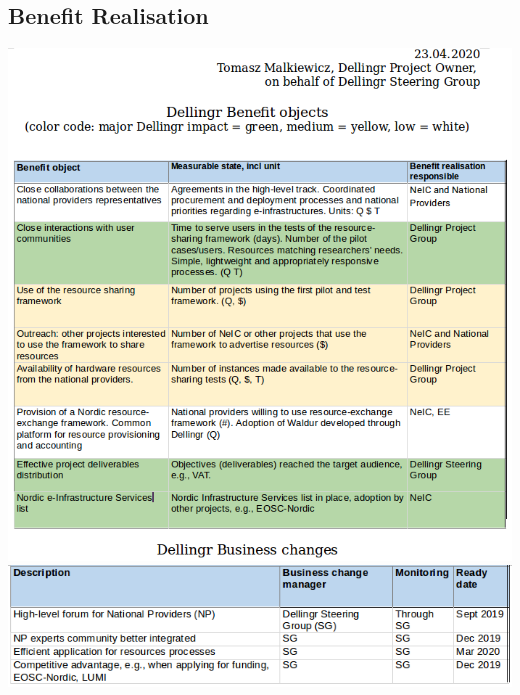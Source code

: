 \documentclass{article}
\begin{document}
\begin{appendices}
\section{Benefit Realisation}
\label{app:benefit}
\begin{center}
\includegraphics[scale=0.6]{Benefit_realization_1.png}
\includegraphics[scale=0.6]{Benefit_realization_2.png}
\end{center}

\end{appendices}
\end{document}
